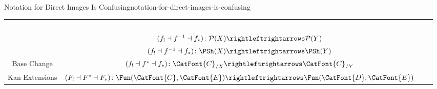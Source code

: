 \begin{warning}{Notation for Direct Images Is Confusing}{notation-for-direct-images-is-confusing}
    \setlength\cellspacebottomlimit{3pt}
    \renewcommand{\arraystretch}{1.2}
    \begin{center}
        \begin{tabular}{|Sc|Sc|}\hline{}
            \textcolor{white}{\textbf{\textsc{Situation}}}                    & \textcolor{white}{\textbf{\textsc{Adjoint String}}}                                                                    \\
                       & $(f_{!}\dashv f^{-1}\dashv f_{*})\colon\mathcal{P}(X)\rightleftrightarrows\mathcal{P}(Y)$                              \\
             & $(f_{!}\dashv f^{-1}\dashv f_{*})\colon\PSh(X)\rightleftrightarrows\PSh(Y)$                                            \\
            Base Change                                                       & $(f_{!}\dashv f^{*}\dashv f_{*})\colon\CatFont{C}_{/X}\rightleftrightarrows\CatFont{C}_{/Y}$                           \\
            Kan Extensions                                                    & $(F_{!}\dashv F^{*}\dashv F_{*})\colon\Fun(\CatFont{C},\CatFont{E})\rightleftrightarrows\Fun(\CatFont{D},\CatFont{E})$ \\\hline
        \end{tabular}
    \end{center}
    \endgroup
    {}
\end{warning}

